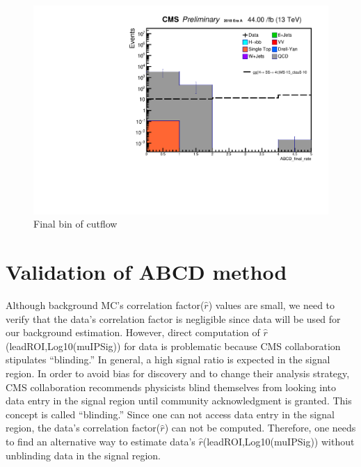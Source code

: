  \begin{figure}[h!]
   \caption{Final bin of cutflow}
   \label{fig:Finalbin}
   \centering
   \includegraphics[width=0.67\linewidth]{figs/log_CutflAnalysisNote_MS-15_ctauS-10_ABCD_final_rate.pdf}
 \end{figure}

\section{Validation of ABCD method}
Although background MC's correlation factor($\hat{r}$) values are small, we need to verify that the data's correlation factor is negligible since data will be used for our background estimation.
However, direct computation of $\hat{r}$(leadROI,Log10(muIPSig)) for data is problematic because CMS collaboration stipulates ``blinding.''
In general, a high signal ratio is expected in the signal region.
In order to avoid bias for discovery and to change their analysis strategy, CMS collaboration recommends physicists blind themselves from looking into data entry in the signal region until community acknowledgment is granted.
This concept is called ``blinding.''
Since one can not access data entry in the signal region, the data's correlation factor($\hat{r}$) can not be computed.
Therefore, one needs to find an alternative way to estimate data's $\hat{r}$(leadROI,Log10(muIPSig)) without unblinding data in the signal region.

